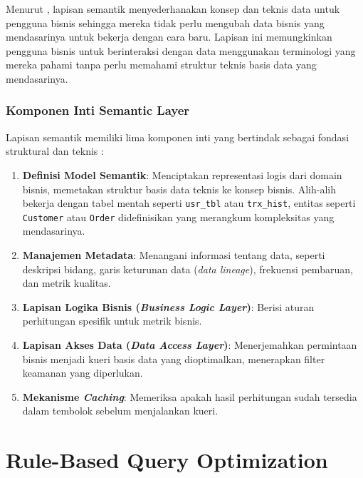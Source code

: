 Menurut \textcite{atscale2025semantic}, lapisan semantik menyederhanakan konsep dan teknis data untuk pengguna bisnis sehingga mereka tidak perlu mengubah data bisnis yang mendasarinya untuk bekerja dengan cara baru. Lapisan ini memungkinkan pengguna bisnis untuk berinteraksi dengan data menggunakan terminologi yang mereka pahami tanpa perlu memahami struktur teknis basis data yang mendasarinya.

\subsubsection{Komponen Inti Semantic Layer}

Lapisan semantik memiliki lima komponen inti yang bertindak sebagai fondasi struktural dan teknis \parencite{dbt2024semantic}:

\begin{enumerate}
\item \textbf{Definisi Model Semantik}: Menciptakan representasi logis dari domain bisnis, memetakan struktur basis data teknis ke konsep bisnis. Alih-alih bekerja dengan tabel mentah seperti \texttt{usr\_tbl} atau \texttt{trx\_hist}, entitas seperti \texttt{Customer} atau \texttt{Order} didefinisikan yang merangkum kompleksitas yang mendasarinya.

\item \textbf{Manajemen Metadata}: Menangani informasi tentang data, seperti deskripsi bidang, garis keturunan data (\textit{data lineage}), frekuensi pembaruan, dan metrik kualitas.

\item \textbf{Lapisan Logika Bisnis (\textit{Business Logic Layer})}: Berisi aturan perhitungan spesifik untuk metrik bisnis.

\item \textbf{Lapisan Akses Data (\textit{Data Access Layer})}: Menerjemahkan permintaan bisnis menjadi kueri basis data yang dioptimalkan, menerapkan filter keamanan yang diperlukan.

\item \textbf{Mekanisme \textit{Caching}}: Memeriksa apakah hasil perhitungan sudah tersedia dalam tembolok sebelum menjalankan kueri.
\end{enumerate}

\section{Rule-Based Query Optimization}

